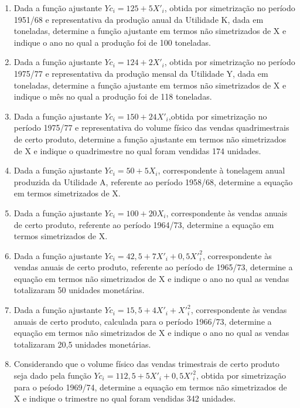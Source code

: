 \begin{enumerate}[resume]
\item Dada a função ajustante $Yc_{i} = 125 + 5X'_{i}$, obtida por simetrização no período 1951/68 e representativa da produção anual da Utilidade K, dada em toneladas, determine a função ajustante em termos não simetrizados de X e indique o ano no qual a produção foi de 100 toneladas.

\item Dada a função ajustante $Yc_{i} = 124 + 2X'_{i}$, obtida por simetrização no período 1975/77 e representativa da produção mensal da Utilidade Y, dada em
toneladas, determine a função ajustante em termos não simetrizados de X e indique o mês no qual a produção foi de 118 toneladas.

\item  Dada a função ajustante $Yc_{i} = 150 + 24X'_{i}$,obtida por simetrização no período 1975/77 e representativa do volume físico das vendas quadrimestrais
de certo produto, determine a função ajustante em termos não simetrizados de X e indique o quadrimestre no qual foram vendidas 174 unidades.

\item  Dada a função ajustante $Yc_{i} = 50 + 5X_{i}$, correspondente à tonelagem anual produzida da Utilidade A, referente ao período 1958/68, determine a equação em termos simetrizados de X.

\item Dada a função ajustante $Yc_{i} = 100 + 20X_{i}$,  correspondente às vendas anuais de certo produto, referente ao período 1964/73, determine a equação em termos simetrizados de X.

\item Dada a função ajustante $Yc_{i} = 42,5 + 7X'_{i} + 0,5X'^{2}_{i}$, correspondente às vendas anuais de certo produto, referente ao período de 1965/73, determine a equação em termos não simetrizados de X e indique o ano no qual as vendas totalizaram 50 unidades monetárias.

\item Dada a função ajustante $Yc_{i} = 15,5 + 4X'_{i} + X'^{2}_{i} $, correspondente às vendas anuais de certo produto, calculada para o período 1966/73, determine a equação em termos não simetrizados de X e indique o ano no qual as vendas totalizaram 20,5 unidades monetárias.

\item Considerando que o volume físico das vendas trimestrais de certo produto seja dado pela função $Yc_{i} = 112,5 + 5X'_{i} + 0,5X'^{2}_{i}$, obtida por simetrização para o peíodo 1969/74, determine a equação em termos não simetrizados de X e indique o trimestre no qual foram vendidas 342 unidades.


\end{enumerate}
